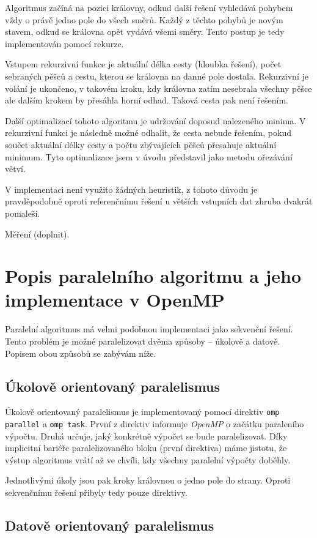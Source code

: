 \documentclass[czech]{article}
\begin{document}
Algoritmus začíná na pozici královny, odkud další řešení vyhledává pohybem vždy o právě jedno pole do všech směrů.
Každý z těchto pohybů je novým stavem, odkud se královna opět vydává všemi směry.
Tento postup je tedy implementován pomocí rekurze.

Vstupem rekurzivní funkce je aktuální délka cesty (hloubka řešení), počet sebraných pěšců a cestu, kterou se královna na danné pole dostala.
Rekurzivní je volání je ukončeno, v takovém kroku, kdy královna zatím nesebrala všechny pěšce ale dalším krokem by přesáhla horní odhad.
Taková cesta pak není řešením.

Další optimalizací tohoto algoritmu je udržování doposud nalezeného minima.
V rekurzivní funkci je následně možné odhalit, že cesta nebude řešením, pokud součet aktuální délky cesty a počtu zbývajících pěšců přesahuje aktuální minimum.
Tyto optimalizace jsem v úvodu představil jako metodu ořezávání větví.

V implementaci není využito žádných heuristik, z tohoto důvodu je pravděpodobně oproti referenčnímu řešení u větších vstupních dat zhruba dvakrát pomaleší.

Měření (doplnit).

\section{Popis paralelního algoritmu a jeho implementace v OpenMP}

Paralelní algoritmus má velmi podobnou implementaci jako sekvenční řešení.
Tento problém je možné paralelizovat dvěma způsoby -- úkolově a datově.
Popisem obou způsobů se zabývám níže.

\subsection{Úkolově orientovaný paralelismus}

Úkolově orientovaný paralelismus je implementovaný pomocí direktiv \texttt{omp parallel} a \texttt{omp task}.
První z direktiv informuje \textit{OpenMP} o začátku paraleního výpočtu.
Druhá určuje, jaký konkrétně výpočet se bude paralelizovat.
Díky implicitní bariéře paralelizovaného bloku (první direktiva) máme jistotu, že výstup algoritmus vrátí až ve chvíli, kdy všechny paralelní výpočty doběhly.

Jednotlivými úkoly jsou pak kroky královnou o jedno pole do strany.
Oproti sekvenčnímu řešení přibyly tedy pouze direktivy.

\subsection{Datově orientovaný paralelismus}
\end{document}

